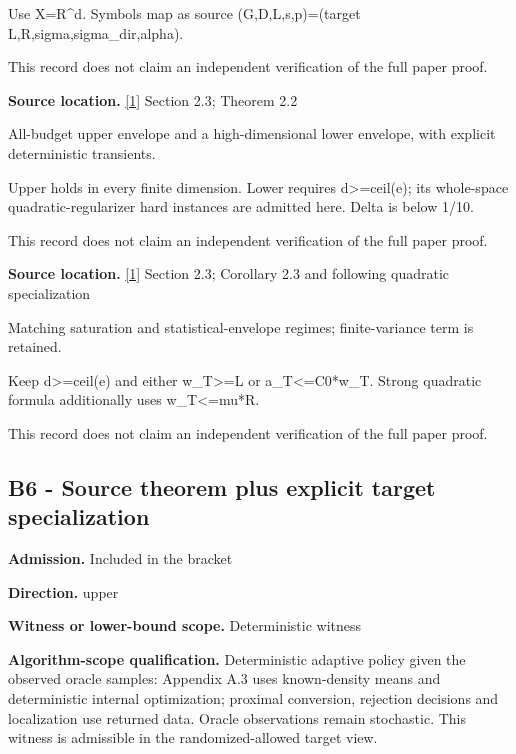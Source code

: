 \documentclass[10pt,a4paper]{article}
\begin{document}
Use X=R\textasciicircum{}d. Symbols map as source (G,D,L,s,p)=(target L,R,sigma,sigma\_dir,alpha).



This record does not claim an independent verification of the full paper proof.



\textbf{Source location.} \href{https://arxiv.org/html/2610.00260v2}{[1]} Section 2.3; Theorem 2.2



All-budget upper envelope and a high-dimensional lower envelope, with explicit deterministic transients.



Upper holds in every finite dimension. Lower requires d>=ceil(e); its whole-space quadratic-regularizer hard instances are admitted here. Delta is below 1/10.



This record does not claim an independent verification of the full paper proof.



\textbf{Source location.} \href{https://arxiv.org/html/2610.00260v2}{[1]} Section 2.3; Corollary 2.3 and following quadratic specialization



Matching saturation and statistical-envelope regimes; finite-variance term is retained.



Keep d>=ceil(e) and either w\_T>=L or a\_T<=C0*w\_T. Strong quadratic formula additionally uses w\_T<=mu*R.



This record does not claim an independent verification of the full paper proof.



\subsection{B6 - Source theorem plus explicit target specialization}


\textbf{Admission.} Included in the bracket



\textbf{Direction.} upper



\textbf{Witness or lower-bound scope.} Deterministic witness



\textbf{Algorithm-scope qualification.} Deterministic adaptive policy given the observed oracle samples: Appendix A.3 uses known-density means and deterministic internal optimization; proximal conversion, rejection decisions and localization use returned data. Oracle observations remain stochastic. This witness is admissible in the randomized-allowed target view.
\end{document}
